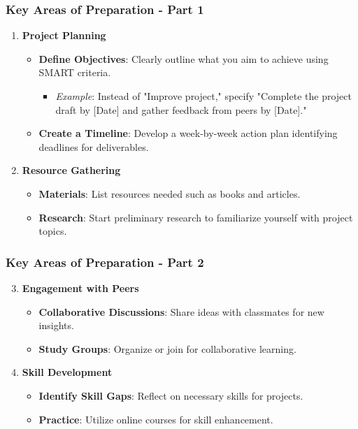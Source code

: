 \documentclass[aspectratio=169]{beamer}
\begin{document}
\begin{frame}[fragile]
    \frametitle{Key Areas of Preparation - Part 1}
    \begin{enumerate}
        \item \textbf{Project Planning}
            \begin{itemize}
                \item \textbf{Define Objectives}: Clearly outline what you aim to achieve using SMART criteria.
                \begin{itemize}
                    \item \textit{Example}: Instead of "Improve project," specify "Complete the project draft by [Date] and gather feedback from peers by [Date]."
                \end{itemize}
                \item \textbf{Create a Timeline}: Develop a week-by-week action plan identifying deadlines for deliverables.
            \end{itemize}
        \item \textbf{Resource Gathering}
            \begin{itemize}
                \item \textbf{Materials}: List resources needed such as books and articles.
                \item \textbf{Research}: Start preliminary research to familiarize yourself with project topics.
            \end{itemize}
    \end{enumerate}
\end{frame}

\begin{frame}[fragile]
    \frametitle{Key Areas of Preparation - Part 2}
    \begin{enumerate}
        \setcounter{enumi}{2} %
        \item \textbf{Engagement with Peers}
            \begin{itemize}
                \item \textbf{Collaborative Discussions}: Share ideas with classmates for new insights.
                \item \textbf{Study Groups}: Organize or join for collaborative learning.
            \end{itemize}
        \item \textbf{Skill Development}
            \begin{itemize}
                \item \textbf{Identify Skill Gaps}: Reflect on necessary skills for projects.
                \item \textbf{Practice}: Utilize online courses for skill enhancement.
            \end{itemize}
    \end{enumerate}
\end{frame}
\end{document}
